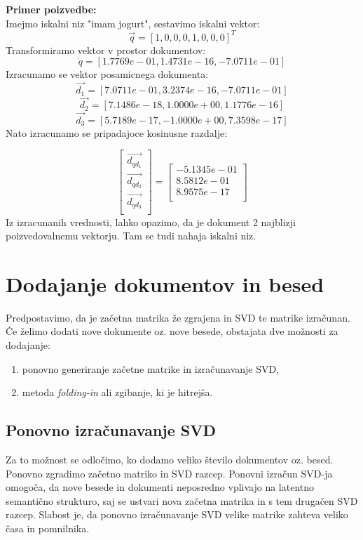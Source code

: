 \documentclass{article}
\begin{document}
\textbf{Primer poizvedbe:}\\
Imejmo iskalni niz "imam jogurt", sestavimo iskalni vektor:
\[
\vec{q} = [1, 0, 0, 0, 1, 0, 0, 0]^T
\] Transformiramo vektor v prostor dokumentov:
\[
    \dot{q} =  [  1.7769e-01,   1.4731e-16,  -7.0711e-01]
\] Izracunamo se vektor posamicnega dokumenta:
\[
    \vec{d_1} = [ 7.0711e-01,   3.2374e-16,  -7.0711e-01]
\]
\[
    \vec{d_2} = [ 7.1486e-18,   1.0000e+00,   1.1776e-16]
\]
\[
    \vec{d_3} = [5.7189e-17,  -1.0000e+00,   7.3598e-17]
\] Nato izracunamo se pripadajoce kosinusne razdalje:

\[
 \begin{bmatrix}
    \vec{d_{q d_1}} \\ 
    \vec{d_{q d_2}} \\
    \vec{d_{q d_3}} \\
 \end{bmatrix} =
  \begin{bmatrix}
    -5.1345e-01 \\
    8.5812e-01 \\
    8.9575e-17 \\
 \end{bmatrix}
\]
Iz izracunanih vrednosti, lahko opazimo, da je dokument 2 najblizji poizvedovalnemu vektorju. Tam se tudi nahaja iskalni niz.
\newpage

\section{Dodajanje dokumentov in besed}
Predpostavimo, da je začetna matrika že zgrajena in SVD te matrike izračunan. Če želimo dodati nove dokumente oz. nove besede, obstajata dve možnosti za dodajanje:
\begin{enumerate}
    \item ponovno generiranje začetne matrike in izračunavanje SVD,
    \item metoda \textit{folding-in} ali zgibanje, ki je hitrejša.
\end{enumerate}
\subsection{Ponovno izračunavanje SVD}
 Za to možnost se odločimo, ko dodamo veliko število dokumentov oz. besed. Ponovno zgradimo začetno matriko in SVD razcep. Ponovni izračun SVD-ja omogoča, da nove besede in dokumenti neposredno vplivajo na latentno semantično strukturo, saj se ustvari nova začetna matrika in s tem drugačen SVD razcep. Slabost je, da ponovno izračunavanje SVD velike matrike zahteva veliko časa in pomnilnika.
\end{document}
